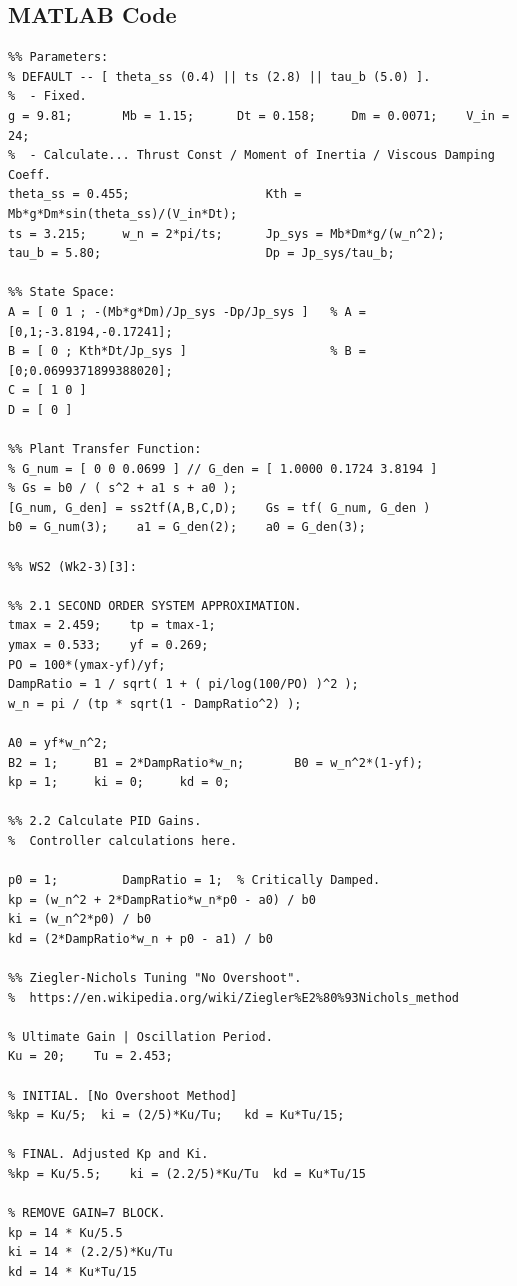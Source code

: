 \documentclass[11pt]{article}
\begin{document}
\subsection{MATLAB Code}
\begin{lstlisting}[frame=single]
%% WS2 (Wk2-3)[2]:
%% Parameters:
% DEFAULT -- [ theta_ss (0.4) || ts (2.8) || tau_b (5.0) ].
%  - Fixed.
g = 9.81;       Mb = 1.15;      Dt = 0.158;     Dm = 0.0071;    V_in = 24;
%  - Calculate... Thrust Const / Moment of Inertia / Viscous Damping Coeff.
theta_ss = 0.455;                   Kth = Mb*g*Dm*sin(theta_ss)/(V_in*Dt);
ts = 3.215;     w_n = 2*pi/ts;      Jp_sys = Mb*Dm*g/(w_n^2);
tau_b = 5.80;                       Dp = Jp_sys/tau_b;

%% State Space:
A = [ 0 1 ; -(Mb*g*Dm)/Jp_sys -Dp/Jp_sys ]   % A = [0,1;-3.8194,-0.17241];
B = [ 0 ; Kth*Dt/Jp_sys ]                    % B = [0;0.0699371899388020];
C = [ 1 0 ]
D = [ 0 ]                        

%% Plant Transfer Function:
% G_num = [ 0 0 0.0699 ] // G_den = [ 1.0000 0.1724 3.8194 ]
% Gs = b0 / ( s^2 + a1 s + a0 );
[G_num, G_den] = ss2tf(A,B,C,D);    Gs = tf( G_num, G_den )
b0 = G_num(3);    a1 = G_den(2);    a0 = G_den(3);

%% WS2 (Wk2-3)[3]:

%% 2.1 SECOND ORDER SYSTEM APPROXIMATION.
tmax = 2.459;    tp = tmax-1;
ymax = 0.533;    yf = 0.269;
PO = 100*(ymax-yf)/yf;
DampRatio = 1 / sqrt( 1 + ( pi/log(100/PO) )^2 );
w_n = pi / (tp * sqrt(1 - DampRatio^2) );

A0 = yf*w_n^2;
B2 = 1;     B1 = 2*DampRatio*w_n;       B0 = w_n^2*(1-yf);
kp = 1;     ki = 0;     kd = 0;

%% 2.2 Calculate PID Gains.
%  Controller calculations here.

p0 = 1;         DampRatio = 1;  % Critically Damped.
kp = (w_n^2 + 2*DampRatio*w_n*p0 - a0) / b0
ki = (w_n^2*p0) / b0
kd = (2*DampRatio*w_n + p0 - a1) / b0

%% Ziegler-Nichols Tuning "No Overshoot".
%  https://en.wikipedia.org/wiki/Ziegler%E2%80%93Nichols_method

% Ultimate Gain | Oscillation Period.
Ku = 20;    Tu = 2.453;

% INITIAL. [No Overshoot Method]
%kp = Ku/5;  ki = (2/5)*Ku/Tu;   kd = Ku*Tu/15;

% FINAL. Adjusted Kp and Ki.
%kp = Ku/5.5;    ki = (2.2/5)*Ku/Tu  kd = Ku*Tu/15

% REMOVE GAIN=7 BLOCK.
kp = 14 * Ku/5.5
ki = 14 * (2.2/5)*Ku/Tu
kd = 14 * Ku*Tu/15


\end{lstlisting}
\end{document}
